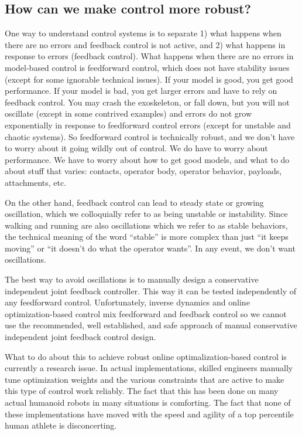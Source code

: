 \documentclass[letterpaper,12pt,fullpage]{article}
\begin{document}
\subsection{How can we make control more robust?}

One way to understand control systems is to separate 1) what happens when there
are no errors and feedback control is not active, and 2) what happens in response
to errors (feedback control). 
What happens when there are no errors in model-based control is 
feedforward control, which does not have stability issues (except for some ignorable
technical issues). If your model is good, you get good performance. If your
model is bad, you get larger errors and have to rely on feedback control.
You may crash the exoskeleton, or fall down, but you will not oscillate
(except in some contrived examples) and errors do not grow exponentially in
response to feedforward control errors (except for unstable and chaotic systems).
So feedforward control is technically robust,  
and we don't have to worry about it going wildly out of control.
We do have to worry about performance.
We have
to worry about how to get good models, and what to do about stuff that varies:
contacts, operator body, operator behavior, payloads, attachments, etc.

On the other hand, feedback control can lead to steady state or growing
oscillation, which we colloquially refer to as being unstable or instability.
Since walking and running are also oscillations which we refer to as stable
behaviors, the technical meaning of the word ``stable'' is more complex than
just ``it keeps moving'' or ``it doesn't do what the operator wants''.
In any event, we don't want oscillations.

The best way to avoid oscillations is to manually design a conservative 
independent joint feedback controller.
This way it can be tested independently of any
feedforward control.
Unfortunately, inverse dynamics and online optimization-based control mix
feedforward and feedback control so we cannot use the recommended, well established,
and safe approach of manual conservative independent joint feedback control design. 

What to do about this to achieve robust online optimalization-based control is
currently a research issue. In actual implementations, skilled engineers manually
tune optimization weights and the various constraints that are active to
make this type of control work reliably. The fact that this has been done on many actual
humanoid robots in many situations is comforting. The fact that none of these
implementations have moved with the speed and agility of a top percentile
human athlete is disconcerting.
\end{document}
